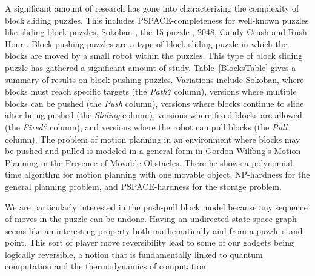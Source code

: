 A significant amount of research has gone into characterizing the complexity of block sliding puzzles. This includes PSPACE-completeness for well-known puzzles like sliding-block puzzles\cite{hearn2005pspace}, Sokoban \cite{Sokoban98, DZ96}, the 15-puzzle \cite{15Puzzle}, 2048\cite{abdelkader2048}, Candy Crush\cite{guala2014bejeweled} and Rush Hour \cite{RushHour02}. Block pushing puzzles are a type of block sliding puzzle in which the blocks are moved by a small robot within the puzzles. This type of block sliding puzzle has gathered a significant amount of study. Table~\ref{BlocksTable} gives a summary of results on block pushing puzzles. Variations include Sokoban\cite{Sokoban98, DZ96}, where blocks must reach specific targets (the \emph{Path?} column), versions where multiple blocks can be pushed\cite{Push100, Push*00, Push2F02, DZ96, Sokoban98, Pull10} (the \emph{Push} column), versions where blocks continue to slide after being pushed\cite{PushPushk04, Push*00} (the \emph{Sliding} column), versions where fixed blocks are allowed\cite{DO92, Push2F02} (the \emph{Fixed?} column), and versions where the robot can pull blocks\cite{Pull10} (the \emph{Pull} column). The problem of motion planning in an environment where blocks may be pushed and pulled is modeled in a general form in Gordon Wilfong's Motion Planning in the Presence of Movable Obstacles\cite{PushPull91}. There he shows a polynomial time algorithm for motion planning with one movable object, NP-hardness for the general planning problem, and PSPACE-hardness for the storage problem. 

We are particularly interested in the push-pull block model because any sequence of moves in the puzzle can be undone.  Having an undirected state-space graph seems like an interesting property both mathematically and from a puzzle stand-point. This sort of player move reversibility lead to some of our gadgets being logically reversible, a notion that is fundamentally linked to quantum computation and the thermodynamics of computation. 


